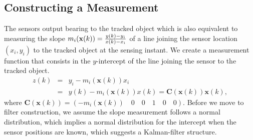 \subsection{Constructing a Measurement}
The sensors output bearing to the tracked object which is also equivalent to measuring the slope $m_i(\mathbf{x}(k))={y(k)-y_i \over x(k)-x_i}$ of a line joining the sensor location $(x_i,y_i)$ to the tracked object at the sensing instant. We create a measurement function that consists in the  $y$-intercept of the line joining the sensor to the tracked object.
\begin{eqnarray}
z(k)&=&y_i-m_i(\mathbf{x}(k))x_i\nonumber\\
&=&y(k)-m_i(\mathbf{x}(k))x(k)=\mathbf{C}(\mathbf{x}(k))\mathbf{x}(k)\label{eqn:measurement},
\end{eqnarray}
where $\mathbf{C}(\mathbf{x}(k))=\left(-m_i(\mathbf{x}(k))\quad 0\quad 0\quad 1\quad 0\quad 0\right)$. Before we move to filter construction, we assume the slope measurement follows a normal distribution, which implies a normal distribution for the intercept when the sensor positions are known, which suggests a Kalman-filter structure.

